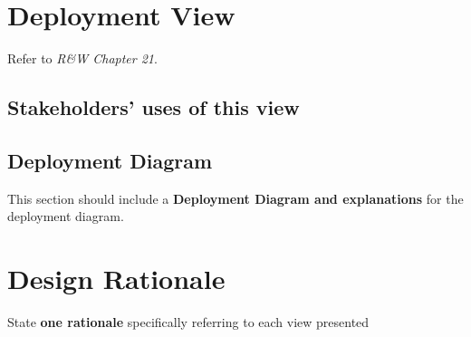 \section{Deployment View}

Refer to \textit{R\&W Chapter 21}. 

\subsection{Stakeholders’ uses of this view}

\subsection{Deployment Diagram}

This section should include a \textbf{Deployment Diagram and explanations} for the deployment diagram.

\section{Design Rationale}
State \textbf{one rationale} specifically referring to each view presented